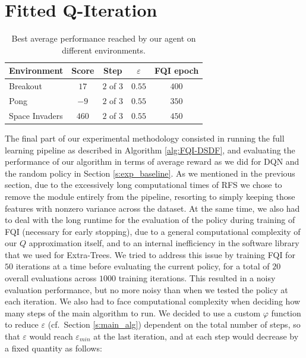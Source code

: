 \section{Fitted Q-Iteration} \label{s:exp_fqi}
%
\begin{table}
    \centering
    \begin{tabular}{l c c c c} 
	\hline
	Environment    & Score    & Step       & $\varepsilon$ & FQI epoch  \\ 
	\hline 
	Breakout       & $17$     & $2$ of $3$ & $0.55$        & $400$     \\
	Pong           & $-9$     & $2$ of $3$ & $0.55$        & $350$     \\
	Space Invaders & $460$    & $2$ of $3$ & $0.55$        & $450$     \\
	\hline
    \end{tabular}
    \caption[Performance of our algorithm]{Best average performance reached by 
	    our agent on different environments.}
    \label{t:avg_performance_only_ours}
\end{table}
%
The final part of our experimental methodology consisted in running the full
learning pipeline as described in Algorithm \ref{alg:FQI-DSDF}, and evaluating
the performance of our algorithm in terms of average reward as we did for DQN
and the random policy in Section \ref{s:exp_baseline}. 
As we mentioned in the previous section, due to the excessively long 
computational times of RFS we chose to remove the module entirely from the 
pipeline, resorting to simply keeping those features with nonzero variance 
across the dataset. 
At the same time, we also had to deal with the long runtime for the evaluation 
of the policy during training of FQI (necessary for early stopping), due to a 
general computational complexity of our $Q$ approximation itself, and to an 
internal inefficiency in the software library that we used for Extra-Trees.
We tried to address this issue by training FQI for $50$ iterations at a time
before evaluating the current policy, for a total of $20$ overall evaluations
across $1000$ training iterations. 
This resulted in a noisy evaluation performance, but no more noisy than when we
tested the policy at each iteration. 
We also had to face computational complexity when deciding how many steps
of the main algorithm to run. 
We decided to use a custom $\varphi$ function to reduce $\varepsilon$ (cf.\ 
Section \ref{s:main_alg}) dependent on the total number of steps, so that 
$\varepsilon$ would reach $\varepsilon_{min}$ at the last iteration, and 
at each step would decrease by a fixed quantity as follows:
